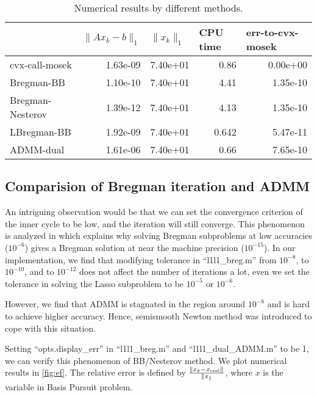 \documentclass[conference,onecolumn,12pt]{IEEEtran}
\newcommand{\<}{\langle}
\renewcommand{\>}{\rangle}
\numberwithin{equation}{section}
\begin{document}
        \begin{table}[!htbp]
            \centering
\begin{tabular}{lrrrr}
    \toprule
    & \multicolumn{1}{l}{$\|Ax_k-b\|_1$} & \multicolumn{1}{l}{$\|x_k\|_1$} & \multicolumn{1}{l}{CPU time} & \multicolumn{1}{l}{err-to-cvx-mosek} \\
    \midrule
cvx-call-mosek & 1.63e-09 &  7.40e+01 & 0.86 & 0.00e+00 \\
Bregman-BB &1.10e-10 &  7.40e+01 & 4.41 & 1.35e-10 \\
Bregman-Nesterov & 1.39e-12 &  7.40e+01 & 4.13 & 1.35e-10 \\
LBregman-BB & 1.92e-09 &  7.40e+01 & 0.642 & 5.47e-11 \\
ADMM-dual & 1.61e-06 &  7.40e+01 & 0.66 & 7.65e-10 \\
\bottomrule
\end{tabular}%
\caption{Numerical results by different methods.}
        \end{table}

\subsection{Comparision of Bregman iteration and ADMM}
    An intriguing observation would be that we can set the convergence criterion of the inner cycle to be low, and the iteration will still converge. This phenomenon is analyzed in \cite{yin2013error} which explains why solving Bregman subproblems at low accuracies ($10^{-6}$) gives a Bregman solution at near the machine precision ($10^{-15}$). In our implementation, we find that modifying tolerance in ``l1l1\_breg.m'' from $10^{-8}$, to $10^{-10}$, and to $10^{-12}$ does not affect the number of iterations a lot, even we set the tolerance in solving the Lasso subproblem to be $10^{-5}$ or $10^{-6}$.

    However, we find that ADMM is stagnated in the region around $10^{-8}$ and is hard to achieve higher accuracy. Hence, semismooth Newton method was introduced to cope with this situation.

    Setting ``opts.display\_err'' in ``l1l1\_breg.m'' and ``l1l1\_dual\_ADMM.m'' to be 1, we can verify this phenomenon of BB/Nesterov method. We plot numerical results in \ref{fig:ef}. The relative error is defined by $\frac{\|x_k-x_{\rm real}\|}{\|x_\real\|}$, where $x$ is the variable in Basis Pursuit problem.
    \begin{figure*}[!htbp]
            \caption{Error forgetting and Stagnation}
            \label{fig:ef}
    \end{figure*}
\clearpage
\end{document}
